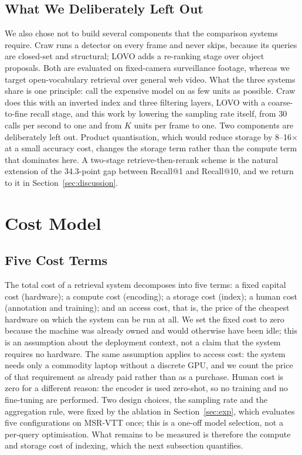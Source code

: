 \documentclass[journal]{IEEEtran}
\begin{document}
\subsection{What We Deliberately Left Out}
We also chose not to build several components that the comparison systems require. Craw runs a
detector on every frame and never skips, because its queries are closed-set and structural;
LOVO adds a re-ranking stage over object proposals. Both are evaluated on fixed-camera
surveillance footage, whereas we target open-vocabulary retrieval over general web video. What
the three systems share is one principle: call the expensive model on as few units as possible.
Craw does this with an inverted index and three filtering layers, LOVO with a coarse-to-fine
recall stage, and this work by lowering the sampling rate itself, from 30 calls per second to
one and from $K$ units per frame to one. Two components are deliberately left out. Product
quantisation, which would reduce storage by 8--16$\times$ at a small accuracy cost, changes the
storage term rather than the compute term that dominates here. A two-stage retrieve-then-rerank
scheme is the natural extension of the 34.3-point gap between Recall@1 and Recall@10, and we
return to it in Section~\ref{sec:discussion}.

\section{Cost Model}

\subsection{Five Cost Terms}
The total cost of a retrieval system decomposes into five terms: a fixed capital cost
(hardware); a compute cost (encoding); a storage cost (index); a human cost (annotation and
training); and an access cost, that is, the price of the cheapest hardware on which the system
can be run at all. We set the fixed cost to zero because the machine was already owned and
would otherwise have been idle; this is an assumption about the deployment context, not a claim
that the system requires no hardware. The same assumption applies to access cost: the system
needs only a commodity laptop without a discrete GPU, and we count the price of that
requirement as already paid rather than as a purchase. Human cost is zero for a different
reason: the encoder is used zero-shot, so no training and no fine-tuning are performed. Two
design choices, the sampling rate and the aggregation rule, were fixed by the ablation in
Section~\ref{sec:exp}, which evaluates five configurations on MSR-VTT once; this is a one-off
model selection, not a per-query optimisation. What remains to be measured is therefore the
compute and storage cost of indexing, which the next subsection quantifies.
\end{document}
